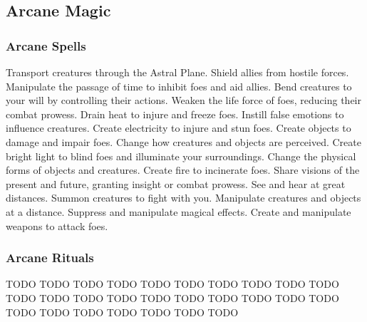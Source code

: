 
\small
\subsection{Arcane Magic}\label{Arcane Magic}
\subsubsection{Arcane Spells}\label{Arcane Spells}
\begin{spelllist}
 Transport creatures through the Astral Plane.
 Shield allies from hostile forces.
 Manipulate the passage of time to inhibit foes and aid allies.
 Bend creatures to your will by controlling their actions.
 Weaken the life force of foes, reducing their combat prowess.
 Drain heat to injure and freeze foes.
 Instill false emotions to influence creatures.
 Create electricity to injure and stun foes.
 Create objects to damage and impair foes.
 Change how creatures and objects are perceived.
 Create bright light to blind foes and illuminate your surroundings.
 Change the physical forms of objects and creatures.
 Create fire to incinerate foes.
 Share visions of the present and future, granting insight or combat prowess.
 See and hear at great distances.
 Summon creatures to fight with you.
 Manipulate creatures and objects at a distance.
 Suppress and manipulate magical effects.
 Create and manipulate weapons to attack foes.
\end{spelllist}
\subsubsection{Arcane Rituals}\label{Arcane Rituals}
\begin{spelllist}
 TODO
 TODO
 TODO
 TODO
 TODO
 TODO
 TODO
 TODO
 TODO
 TODO
 TODO
 TODO
 TODO
 TODO
 TODO
 TODO
 TODO
 TODO
 TODO
 TODO
 TODO
 TODO
 TODO
 TODO
 TODO
 TODO
 TODO
\end{spelllist}





